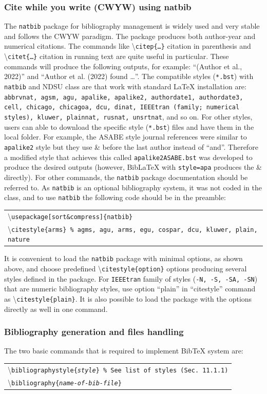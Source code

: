\documentclass{article}
\newcommand\cmd[1]{\textbackslash\texttt{#1}}
\newcommand\ix[1]{#1\index{#1}} %
\newcommand\ixm[2]{#2\index{#1!#2}} %
\newcommand\ccmd[1]{ %
\begin{center}
\begin{tabular}{l}
#1
\end{tabular}
\end{center}
}
\begin{document}
\subsubsection{Cite while you write (CWYW) using natbib}\label{cwyw}
The \texttt{\ix{natbib}} package for bibliography management is widely used and very stable and follows the CWYW paradigm. The package produces both author-year and numerical citations. The commands like \cmd{citep\{\ldots\}} citation in parenthesis and \cmd{citet\{\ldots\}} citation in running text are quite useful in particular. These commands will produce the following outputs, for example: ``(Author et al., 2022)'' and ``Author et al. (2022) found \ldots''. The compatible styles (\texttt{*.bst}) with \texttt{natbib} and NDSU class are that work with standard \LaTeX{} installation are:  \texttt{abbrvnat, agsm, agu, apalike, apalike2, authordate1, authordate3, cell, chicago, chicagoa, dcu, dinat, IEEEtran (family;  numerical styles), kluwer, plainnat, rusnat, unsrtnat}, and so on. For other styles, users can able to download the specific style (\texttt{*.bst}) files and have them in the local folder. For example, the ASABE style journal references were similar to  \texttt{apalike2} style but they use \& before the last author instead of ``and''. Therefore a modified style that achieves this called \texttt{apalike2ASABE.bst} was developed to produce the desired outputs (however, Bib\LaTeX\/ with \texttt{style=apa} produces the \& directly). For other commands, the \texttt{natbib} package documentation should be referred to. As \texttt{natbib} is an optional bibliography system, it was not coded in the class, and to use \texttt{natbib}  the following code should be in the preamble:
\ccmd{
\cmd{usepackage[sort\&compress]\{natbib\}}\\
\cmd{\ixm{bibliography}{citestyle}\{arms\} \% agms, agu, arms, egu, cospar, dcu, kluwer, plain, nature}
}

It is convenient to load the \texttt{natbib} package with minimal options, as shown above, and choose predefined \cmd{citestyle\{option\}} options producing several styles defined in the package. For \texttt{IEEEtran} family of styles (\texttt{-N, -S, -SA, -SN}) that are numeric bibliography styles, use option ``plain'' in ``citestyle'' command as \cmd{citestyle\{plain\}}. It is also possible to load the package with the options directly as well in one command.

\subsubsection{Bibliography generation and files handling}\label{makebib}
The two basic commands that is required to implement BibTeX system are:
\ccmd{
\cmd{bibliographystyle\{\textit{style}\} \% See list of styles (Sec.~\hspace{-1ex}11.1.1)}\\
\cmd{bibliography\{\textit{name-of-bib-file}\}}
}
\end{document}
